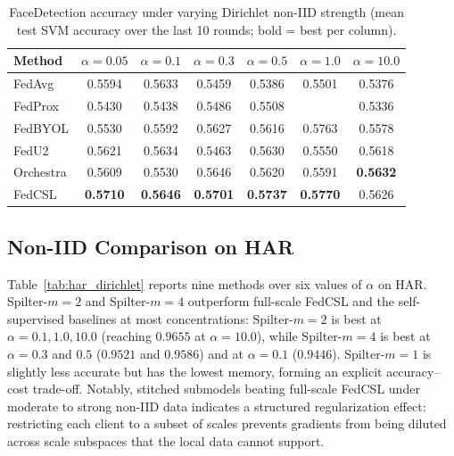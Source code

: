 \documentclass[sigconf]{acmart}
\begin{document}
\begin{table}[t]
  \centering
  \caption{FaceDetection accuracy under varying Dirichlet non-IID strength
  (mean test SVM accuracy over the last 10 rounds; bold = best per column).}
  \label{tab:face_dirichlet}
  \begin{tabular}{lcccccc}
    \toprule
    Method & $\alpha{=}0.05$ & $\alpha{=}0.1$ & $\alpha{=}0.3$ & $\alpha{=}0.5$ & $\alpha{=}1.0$ & $\alpha{=}10.0$ \\
    \midrule
    FedAvg   & 0.5594 & 0.5633 & 0.5459 & 0.5386 & 0.5501 & 0.5376 \\
    FedProx  & 0.5430 & 0.5438 & 0.5486 & 0.5508 &        & 0.5336 \\
    FedBYOL  & 0.5530 & 0.5592 & 0.5627 & 0.5616 & 0.5763 & 0.5578 \\
    FedU2    & 0.5621 & 0.5634 & 0.5463 & 0.5630 & 0.5550 & 0.5618 \\
    Orchestra& 0.5609 & 0.5530 & 0.5646 & 0.5620 & 0.5591 & \textbf{0.5632} \\
    FedCSL   & \textbf{0.5710} & \textbf{0.5646} & \textbf{0.5701} & \textbf{0.5737} & \textbf{0.5770} & 0.5626 \\
    \bottomrule
  \end{tabular}
\end{table}

\subsection{Non-IID Comparison on HAR}

Table~\ref{tab:har_dirichlet} reports nine methods over six values of $\alpha$ on
HAR. Spilter-$m{=}2$ and Spilter-$m{=}4$ outperform full-scale FedCSL and the
self-supervised baselines at most concentrations: Spilter-$m{=}2$ is best at
$\alpha=0.1,1.0,10.0$ (reaching $0.9655$ at $\alpha=10.0$), while Spilter-$m{=}4$
is best at $\alpha=0.3$ and $0.5$ ($0.9521$ and $0.9586$) and at $\alpha=0.1$
($0.9446$). Spilter-$m{=}1$ is slightly less accurate but has the lowest memory,
forming an explicit accuracy--cost trade-off. Notably, stitched submodels beating
full-scale FedCSL under moderate to strong non-IID data indicates a structured
regularization effect: restricting each client to a subset of scales prevents
gradients from being diluted across scale subspaces that the local data cannot
support.
\end{document}

